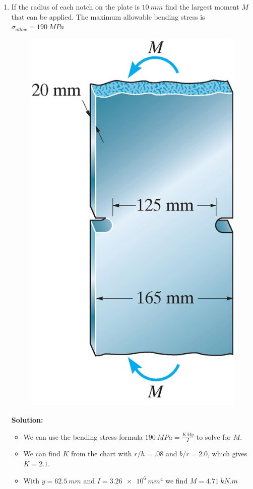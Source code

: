 \documentclass[12pt, oneside]{article}
\begin{document}
\begin{enumerate}
	\item %
		If the radius of each notch on the plate is $ 	\SI{10 }{mm}  $ find the largest moment $M$ that can be applied.
		The maximum allowable bending stress is $\sigma_{allow} = 	\SI{190}{MPa} $
		\begin{figure}[H]
			\centering
			\includegraphics[width=0.3\linewidth]{6-155}
		\end{figure}
			\textbf{Solution:}
			\begin{itemize}
				\item We can use the bending stress formula $ 	\SI{190 }{MPa} = \frac{KMy}{I}  $ to solve for $M$.
				\item We can find $K$ from the chart with $r/h = .08$ and $b/r = 2.0$, which gives $K = 2.1$.
				\item With $y = 	\SI{62.5 }{mm}$ and $I = 	\SI{3.26e6}{mm^4} $ we find $M = 	\SI{4.71}{kN.m} $
			\end{itemize}


\end{enumerate}
\end{document}
